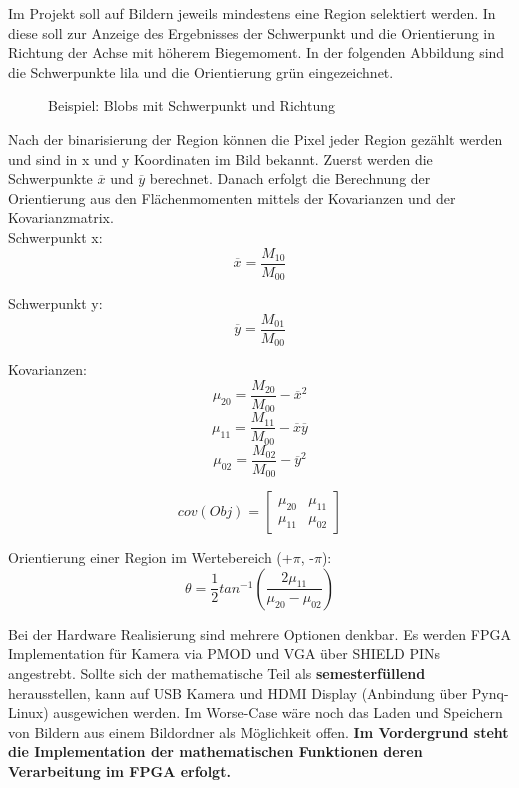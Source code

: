 \documentclass[a4paper]{report}
\begin{document}
Im Projekt soll auf Bildern jeweils mindestens eine Region selektiert werden. In diese soll zur Anzeige des Ergebnisses der Schwerpunkt und die Orientierung in Richtung der Achse mit höherem Biegemoment. In der folgenden Abbildung sind die Schwerpunkte lila und die Orientierung grün eingezeichnet.
	
	\begin{figure}[H]
	\centering
	\caption{Beispiel: Blobs mit Schwerpunkt und Richtung}
	\label{Entwurf des Projects}
	\end{figure}
	
Nach der binarisierung der Region können die Pixel jeder Region gezählt werden und sind in x und y Koordinaten im Bild bekannt. Zuerst werden die Schwerpunkte $\overline{x}$ und $\overline{y}$ berechnet. Danach erfolgt die Berechnung der Orientierung aus den Flächenmomenten mittels der Kovarianzen und der Kovarianzmatrix. \\

Schwerpunkt x: $$\overline{x} = \frac{M_{10}}{M_{00}}$$

Schwerpunkt y: $$\overline{y} = \frac{M_{01}}{M_{00}}$$

Kovarianzen: $$\mu_{20} = \frac{M_{20}}{M_{00}} - \overline{x}^2 $$
			 $$\mu_{11} = \frac{M_{11}}{M_{00}} - \overline{x}\overline{y} $$
			 $$\mu_{02} = \frac{M_{02}}{M_{00}} - \overline{y}^2 $$

     		$$cov(Obj) =\begin{bmatrix}
			 			\mu_{20} & \mu_{11}\\ 
				 		\mu_{11}& \mu_{02}
					 	\end{bmatrix}$$
			
			 
Orientierung einer Region im Wertebereich (+$\pi$, -$\pi$): $$ \theta = \frac{1}{2} tan^{-1}(\frac{2\mu_{11}}{\mu_{20}-\mu_{02}})    $$

Bei der Hardware Realisierung sind mehrere Optionen denkbar. Es werden FPGA Implementation für Kamera via PMOD und VGA über SHIELD PINs angestrebt. Sollte sich der mathematische Teil als \textbf{semesterfüllend} herausstellen, kann auf USB Kamera und HDMI Display (Anbindung über Pynq-Linux) ausgewichen werden. Im Worse-Case wäre noch das Laden und Speichern von Bildern aus einem Bildordner als Möglichkeit offen. \textbf{Im Vordergrund steht die Implementation der mathematischen Funktionen deren Verarbeitung im FPGA erfolgt.}
\end{document}
